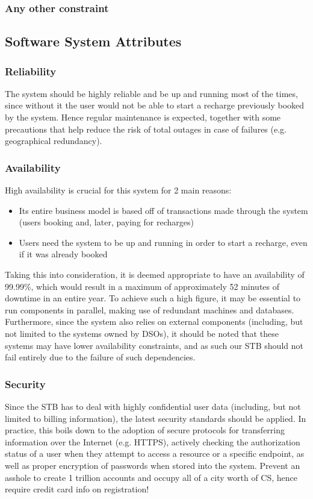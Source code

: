 \documentclass[11pt]{article}
\begin{document}
\subsubsection{Any other constraint}

\subsection{Software System Attributes}
\subsubsection{Reliability}
The system should be highly reliable and be up and running most of the times, since without it the user would not be able to start a recharge previously booked by the system. Hence regular maintenance is expected, together with some precautions that help reduce the risk of total outages in case of failures (e.g. geographical redundancy).

\subsubsection{Availability}
High availability is crucial for this system for 2 main reasons:
\begin{itemize}
    \item Its entire business model is based off of transactions made through the system (users booking and, later, paying for recharges)
    \item Users need the system to be up and running in order to start a recharge, even if it was already booked
\end{itemize}
Taking this into consideration, it is deemed appropriate to have an availability of 99.99\%, which would result in a maximum of approximately 52 minutes of downtime in an entire year. To achieve such a high figure, it may be essential to run components in parallel, making use of redundant machines and databases. \\
Furthermore, since the system also relies on external components (including, but not limited to the systems owned by DSOs), it should be noted that these systems may have lower availability constraints, and as such our STB should not fail entirely due to the failure of such dependencies.

\subsubsection{Security}
Since the STB has to deal with highly confidential user data (including, but not limited to billing information), the latest security standards should be applied. In practice, this boils down to the adoption of secure protocols for transferring information over the Internet (e.g. HTTPS), actively checking the authorization status of a user when they attempt to access a resource or a specific endpoint, as well as proper encryption of passwords when stored into the system.
Prevent an asshole to create 1 trillion accounts and occupy all of a city worth of CS, hence require credit card info on registration!
\end{document}

